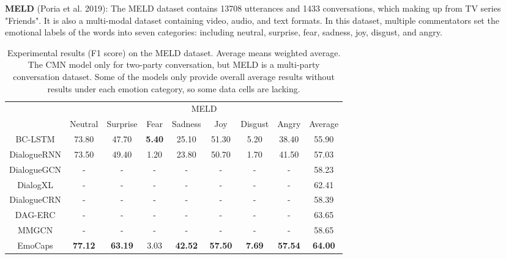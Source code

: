 \documentclass[11pt]{article}
\begin{document}
\noindent\textbf{MELD} (Poria et al. 2019): The MELD dataset contains 13708 utterances and 1433 conversations, which making up from TV series "Friends". It is also a multi-modal dataset containing video, audio, and text formats. In this dataset, multiple commentators set the emotional labels of the words into seven categories: including neutral, surprise, fear, sadness, joy, disgust, and angry.
\begin{table*}[]
	\centering
	\begin{tabular}{c|c|c|c|c|c|c|c|c}
		\hline
		& \multicolumn{8}{c}{MELD}                                                                                                           \\ \cline{2-9} 
		& Neutral        & Surprise       & Fear          & Sadness        & Joy            & Disgust       & Angry          & Average        \\ \hline
		BC-LSTM        & 73.80          & 47.70          & \textbf{5.40} & 25.10          & 51.30          & 5.20          & 38.40          & 55.90          \\
	
		DialogueRNN    & 73.50          & 49.40          & 1.20          & 23.80          & 50.70          & 1.70          & 41.50          & 57.03          \\
		DialogueGCN    & -              & -              & -             & -              & -              & -             & -              & 58.23          \\
		DialogXL       & -              & -              & -             & -              & -              & -             & -              & 62.41          \\
		DialogueCRN       & -              & -              & -             & -              & -              & -             & -              & 58.39          \\
		DAG-ERC       & -              & -              & -             & -              & -              & -             & -              & 63.65          \\
		MMGCN          & -              & -              & -             & -              & -              & -             & -              & 58.65          \\ \hline
		EmoCaps & \textbf{77.12} & \textbf{63.19} & 3.03          & \textbf{42.52} & \textbf{57.50} & \textbf{7.69} & \textbf{57.54} & \textbf{64.00} \\ \hline
	\end{tabular}
	\caption{Experimental results (F1 score) on the MELD dataset. Average means weighted average. The CMN model only for two-party conversation, but MELD is a multi-party conversation dataset. Some of the models only provide overall average results without results under each emotion category, so some data cells are lacking. }
\end{table*}
\end{document}
